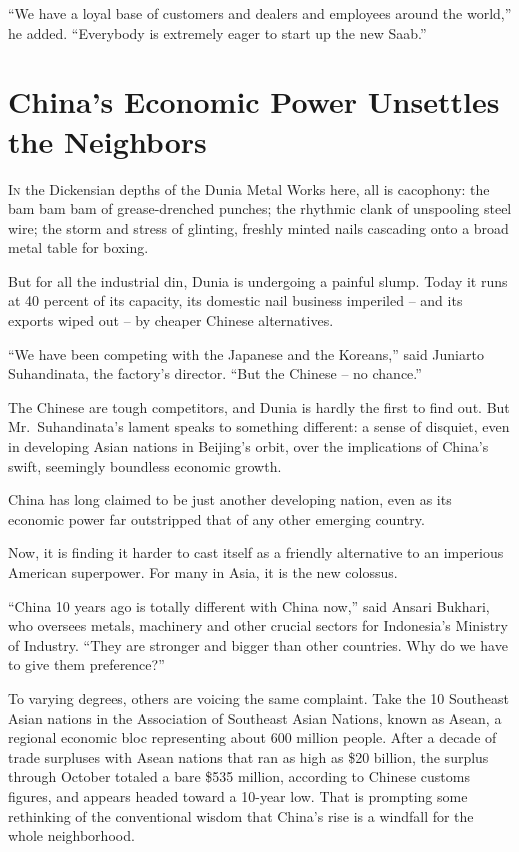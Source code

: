 ﻿\documentclass[12pt]{article}
\begin{document}
``We have a loyal base of customers and dealers and employees around the world,'' he added.
``Everybody is extremely eager to start up the new Saab.''

\section{China's Economic Power Unsettles the Neighbors}

\lettrine{I}{n} the Dickensian depths of the Dunia Metal Works here, all is
cacophony\cite{cacophony}: the bam bam bam of grease-drenched punches; the rhythmic clank of
unspooling steel wire; the storm and stress of glinting, freshly minted nails cascading onto a broad
metal table for boxing.

But for all the industrial din, Dunia is undergoing a painful slump\cite{slump}. Today it runs at 40
percent of its capacity, its domestic nail business imperiled -- and its exports wiped out -- by
cheaper Chinese alternatives.

``We have been competing with the Japanese and the Koreans,'' said Juniarto Suhandinata, the
factory's director. ``But the Chinese -- no chance.''

The Chinese are tough competitors, and Dunia is hardly the first to find out. But Mr.~Suhandinata's
lament speaks to something different: a sense of disquiet, even in developing Asian nations in
Beijing's orbit, over the implications of China's swift, seemingly boundless economic growth.

China has long claimed to be just another developing nation, even as its economic power far
outstripped that of any other emerging country.

Now, it is finding it harder to cast itself as a friendly alternative to an imperious American
superpower. For many in Asia, it is the new colossus.

``China 10 years ago is totally different with China now,'' said Ansari Bukhari, who oversees
metals, machinery and other crucial sectors for Indonesia's Ministry of Industry. ``They are
stronger and bigger than other countries. Why do we have to give them preference?''

To varying degrees, others are voicing the same complaint. Take the 10 Southeast Asian nations in
the Association of Southeast Asian Nations, known as Asean, a regional economic bloc representing
about 600 million people. After a decade of trade surpluses with Asean nations that ran as high as
\$20 billion, the surplus through October totaled a bare \$535 million, according to Chinese customs
figures, and appears headed toward a 10-year low. That is prompting some rethinking of the
conventional wisdom that China's rise is a windfall for the whole neighborhood.
\end{document}

